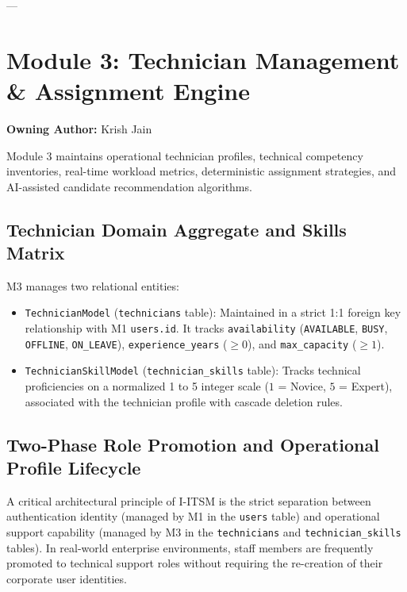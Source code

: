\documentclass[11pt,a4paper,oneside]{report}
\begin{document}
---

\section{Module 3: Technician Management \& Assignment Engine}
\label{sec:module_m3}
\textbf{Owning Author:} Krish Jain

Module 3 maintains operational technician profiles, technical competency inventories, real-time workload metrics, deterministic assignment strategies, and AI-assisted candidate recommendation algorithms.

\subsection{Technician Domain Aggregate and Skills Matrix}
M3 manages two relational entities:
\begin{itemize}
    \item \texttt{TechnicianModel} (\texttt{technicians} table): Maintained in a strict 1:1 foreign key relationship with M1 \texttt{users.id}. It tracks \texttt{availability} (\texttt{AVAILABLE}, \texttt{BUSY}, \texttt{OFFLINE}, \texttt{ON\_LEAVE}), \texttt{experience\_years} ($\ge 0$), and \texttt{max\_capacity} ($\ge 1$).
    \item \texttt{TechnicianSkillModel} (\texttt{technician\_skills} table): Tracks technical proficiencies on a normalized 1 to 5 integer scale ($1$ = Novice, $5$ = Expert), associated with the technician profile with cascade deletion rules.
\end{itemize}

\subsection{Two-Phase Role Promotion and Operational Profile Lifecycle}
\label{sec:m3_two_phase_profile}
A critical architectural principle of I-ITSM is the strict separation between authentication identity (managed by M1 in the \texttt{users} table) and operational support capability (managed by M3 in the \texttt{technicians} and \texttt{technician\_skills} tables). In real-world enterprise environments, staff members are frequently promoted to technical support roles without requiring the re-creation of their corporate user identities.
\end{document}
